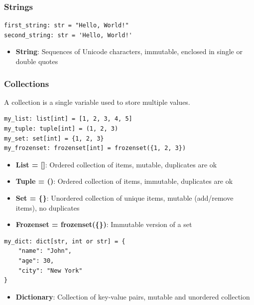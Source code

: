 \subsubsection{Strings}
\begin{codebox}
\begin{verbatim}
first_string: str = "Hello, World!"
second_string: str = 'Hello, World!'
\end{verbatim}
\end{codebox}
\begin{itemize}
\item \textbf{String}: Sequences of Unicode characters, immutable, enclosed in single or double quotes
\end{itemize}

\subsubsection{Collections}
A collection is a single variable used to store multiple values.
\begin{codebox}
\begin{verbatim}
my_list: list[int] = [1, 2, 3, 4, 5]
my_tuple: tuple[int] = (1, 2, 3)
my_set: set[int] = {1, 2, 3}
my_frozenset: frozenset[int] = frozenset({1, 2, 3})
\end{verbatim}
\end{codebox}
\begin{itemize}
\item \textbf{List = []}: Ordered collection of items, mutable, duplicates are ok
\item \textbf{Tuple = ()}: Ordered collection of items, immutable, duplicates are ok
\item \textbf{Set = \{\}}: Unordered collection of unique items, mutable (add/remove items), no duplicates
\item \textbf{Frozenset = frozenset(\{\})}: Immutable version of a set
\end{itemize}

\begin{codebox}
\begin{verbatim}
my_dict: dict[str, int or str] = {
    "name": "John",
    "age": 30,
    "city": "New York"
}
\end{verbatim}
\end{codebox}
\begin{itemize}
\item \textbf{Dictionary}: Collection of key-value pairs, mutable and unordered collection
\end{itemize}


